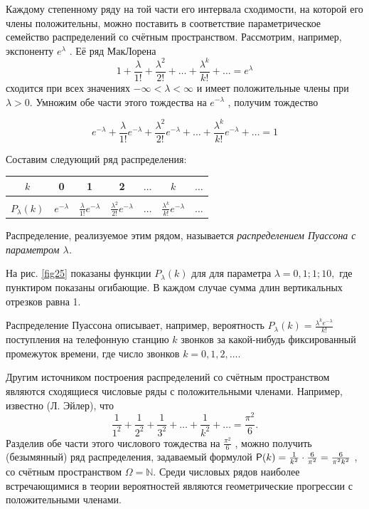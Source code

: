 \begin{zam}
	\label{zam:4.14}
Каждому степенному ряду на той части его интервала
сходимости, на которой его члены положительны, можно поставить в соответствие параметрическое семейство распределений со счётным пространством.
Рассмотрим, например, экспоненту $e^\lambda$ . Её ряд МакЛорена
$$1+ \frac{\lambda}{1!} + \frac{\lambda^2}{2!} + \ldots + \frac{\lambda^k}{k!} + \ldots = e^\lambda$$
сходится при всех значениях $−\infty < \lambda < \infty$ и имеет положительные члены при $\lambda > 0$. Умножим обе части этого тождества на $e^{−\lambda}$ , получим тождество

$$e^{−\lambda}+ \frac{\lambda}{1!} e^{−\lambda} + \frac{\lambda^2}{2!} e^{−\lambda}+ \ldots + \frac{\lambda^k}{k!} e^{−\lambda} + \ldots= 1$$

Составим следующий ряд распределения:

\begin{center}
	\begin{tabular}{|c|c|c|c|c|c|c|}
		\hline
		$k$ 			& 0 								& 1 				  & 2 & $\ldots$ & $k$ 		& $\ldots$ \\ \hline
		&&&&&& \\[-1em] 
		$P_\lambda(k)$  & $e^{-\lambda}$ & $\frac{\lambda}{1!}e^{-\lambda}$ & $\frac{\lambda^2}{2!}e^{-\lambda}$ & $\ldots$ & $\frac{\lambda^k}{k!}e^{-\lambda}$& $\ldots$ \\[1ex] \hline
	\end{tabular}
\end{center}
\end{zam}

\begin{definition}
	\label{def:4.15}
Распределение, реализуемое этим рядом, называется \textit{распределением Пуассона с параметром $\lambda$.}

На рис. \ref{fig25} показаны функции $P_\lambda (k)$ для для параметра $\lambda = 0, 1; 1; 10,$ где
пунктиром показаны огибающие. В каждом случае сумма длин вертикальных отрезков равна 1.

Распределение Пуассона описывает, например, вероятность $P_\lambda (k) = \frac{\lambda^k e^{-\lambda}}{k!}$
поступления на телефонную станцию $k$ звонков за какой-нибудь фиксированный промежуток времени, где число звонков $k = 0, 1, 2, \ldots$.
\end{definition}
\begin{zam}
	\label{zam:4.16}
Другим источником построения распределений со счётным пространством являются сходящиеся числовые ряды с положительными членами. Например, известно (Л. Эйлер), что
$$\frac{1}{1^2} + \frac{1}{2^2} + \frac{1}{3^2} + \ldots + \frac{1}{k^2} + \ldots = \frac{\pi^2}{6}.$$
Разделив обе части этого числового тождества на $\frac{\pi^2}{6}$ , можно получить (безымянный) ряд распределения, задаваемый формулой $\P(k) = \frac{1}{k^2} \cdot \frac{6}{\pi^2} = \frac{6}{\pi^2 k^2}$ , со счётным пространством $\Omega = \mathbb{N}$.
Среди числовых рядов наиболее встречающимися в теории вероятностей являются геометрические прогрессии с положительными членами.
\end{zam}

